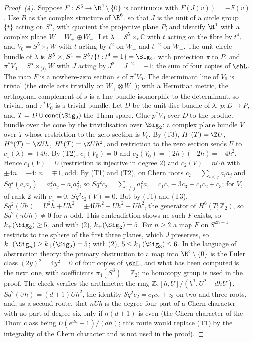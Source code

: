 \begin{proof}
\emph{(4).} Suppose $F : S^{5} \to \R^{4} \setminus \{0\}$ is continuous with $F(J(v)) = -F(v)$. Use $B$ as the complex structure of $\R^{6}$, so that $J$ is the unit of a circle group $\{t\}$ acting on $S^{5}$, with quotient the projective plane $P$; and identify $\R^{4}$ with a complex plane $W = W_{+} \oplus W_{-}$. Let $\lambda = S^{5} \times_{t} \mathbb{C}$ with $t$ acting on the fibre by $t^{4}$, and $V_{0} = S^{5} \times_{t} W$ with $t$ acting by $t^{2}$ on $W_{+}$ and $t^{-2}$ on $W_{-}$. The unit circle bundle of $\lambda$ is $S^{5} \times_{t} S^{1} = S^{5}/\{t : t^{4} = 1\} = \Sig_{2}$, with projection $\pi$ to $P$, and $\pi^{*}V_{0} = S^{5} \times_{\langle J \rangle} W$ with $J$ acting by $J^{2} = J^{-2} = -1$: the sum of four copies of $\shL$. The map $F$ is a nowhere-zero section $s$ of $\pi^{*}V_{0}$. The determinant line of $V_{0}$ is trivial (the circle acts trivially on $W_{+} \otimes W_{-}$); with a Hermitian metric, the orthogonal complement of $s$ is a line bundle isomorphic to the determinant, so trivial, and $\pi^{*}V_{0}$ is a trivial bundle. Let $D$ be the unit disc bundle of $\lambda$, $p : D \to P$, and $T = D \cup \mathrm{cone}(\Sig_{2})$ the Thom space. Glue $p^{*}V_{0}$ over $D$ to the product bundle over the cone by the trivialisation over $\Sig_{2}$: a complex plane bundle $V$ over $T$ whose restriction to the zero section is $V_{0}$. By (T3), $H^{2}(T) = \Z U$, $H^{4}(T) = \Z Uh$, $H^{6}(T) = \Z Uh^{2}$, and restriction to the zero section sends $U$ to $c_{1}(\lambda) = \pm 4h$. By (T2), $c_{1}(V_{0}) = 0$ and $c_{2}(V_{0}) = (2h)(-2h) = -4h^{2}$. Hence $c_{1}(V) = 0$ (restriction is injective in degree $2$) and $c_{2}(V) = nUh$ with $\pm 4n = -4$: $n = \mp 1$, odd. By (T1) and (T2), on Chern roots $c_{2} = \sum_{i<j}a_{i}a_{j}$ and $Sq^{2}(a_{i}a_{j}) = a_{i}^{2}a_{j} + a_{i}a_{j}^{2}$, so $Sq^{2}c_{2} = \sum_{i \neq j}a_{i}^{2}a_{j} = c_{1}c_{2} - 3c_{3} \equiv c_{1}c_{2} + c_{3}$; for $V$, of rank $2$ with $c_{1} = 0$, $Sq^{2}c_{2}(V) = 0$. But by (T1) and (T3), $Sq^{2}(Uh) = U^{2}h + Uh^{2} = \pm 4Uh^{2} + Uh^{2} \equiv Uh^{2}$, the generator of $H^{6}(T; \mathbb{Z}_{2})$, so $Sq^{2}(nUh) \neq 0$ for $n$ odd. This contradiction shows no such $F$ exists, so $k_{+}(\Sig_{2}) \geq 5$, and with (2), $k_{+}(\Sig_{2}) = 5$. For $n \geq 2$ a map $F$ on $S^{2n+1}$ restricts to the sphere of the first three planes, which $J$ preserves, so $k_{+}(\Sig_{n}) \geq k_{+}(\Sig_{2}) = 5$; with (2), $5 \leq k_{+}(\Sig_{3}) \leq 6$. In the language of obstruction theory: the primary obstruction to a map into $\R^{4} \setminus \{0\}$ is the Euler class $(2y)^{2} = 4y^{2} = 0$ of four copies of $\shL$, and what has been computed is the next one, with coefficients $\pi_{4}(S^{3}) = \mathbb{Z}_{2}$; no homotopy group is used in the proof. The check verifies the arithmetic: the ring $\mathbb{Z}_{2}[h, U]/(h^{3}, U^{2} - dhU)$, $Sq^{2}(Uh) = (d+1)Uh^{2}$, the identity $Sq^{2}c_{2} = c_{1}c_{2} + c_{3}$ on two and three roots, and, as a second route, that $nUh$ is the degree-four part of a Chern character with no part of degree six only if $n(d+1)$ is even (the Chern character of the Thom class being $U(e^{dh} - 1)/(dh)$; this route would replace (T1) by the integrality of the Chern character and is not used in the proof).


\end{proof}
